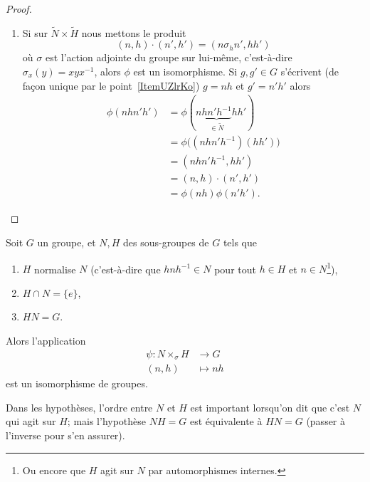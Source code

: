 \begin{proof}
\begin{enumerate}
        \item
            Si sur \( \tilde N\times \tilde H\) nous mettons le produit
            \begin{equation}
                (n,h)\cdot(n',h')=(n\sigma_hn',hh')
            \end{equation}
            où \( \sigma\) est l'action adjointe du groupe sur lui-même, c'est-à-dire \( \sigma_x(y)=xyx^{-1}\), alors \( \phi\) est un isomorphisme. Si \( g,g'\in G\) s'écrivent (de façon unique par le point~\ref{ItemUZlrKo}) \( g=nh\) et \( g'=n'h'\) alors
            \begin{subequations}
                \begin{align}
                    \phi(nhn'h')&=\phi(n\underbrace{hn'h^{-1}}_{\in \tilde N}hh')\\
                    &=\phi\big( (nhn'h^{-1})(hh') \big)\\
                    &=(nhn'h^{-1},hh')\\
                    &=(n,h)\cdot(n',h')\\
                    &=\phi(nh)\phi(n'h').
                \end{align}
            \end{subequations}
    \end{enumerate}
\end{proof}

\begin{corollary}\label{CoroGohOZ}
    Soit \( G\) un groupe, et \( N,H\) des sous-groupes de \( G\) tels que
    \begin{enumerate}
        \item
            \( H\) normalise \( N\) (c'est-à-dire que \( hnh^{-1}\in N\) pour tout \( h\in H\) et \( n\in N\)\footnote{Ou encore que \( H\) agit sur \( N\) par automorphismes internes.}),
        \item
            \( H\cap N=\{ e \}\),
        \item
            \( HN=G\).
    \end{enumerate}
    Alors l'application
    \begin{equation}
        \begin{aligned}
            \psi\colon N\times_{\sigma}H&\to G \\
            (n,h)&\mapsto nh
        \end{aligned}
    \end{equation}
    est un isomorphisme de groupes.
\end{corollary}
Dans les hypothèses, l'ordre entre \( N\) et \( H\) est important lorsqu'on dit que c'est \( N\) qui agit sur \( H\); mais l'hypothèse \( NH=G\) est équivalente à \( HN=G\) (passer à l'inverse pour s'en assurer).

